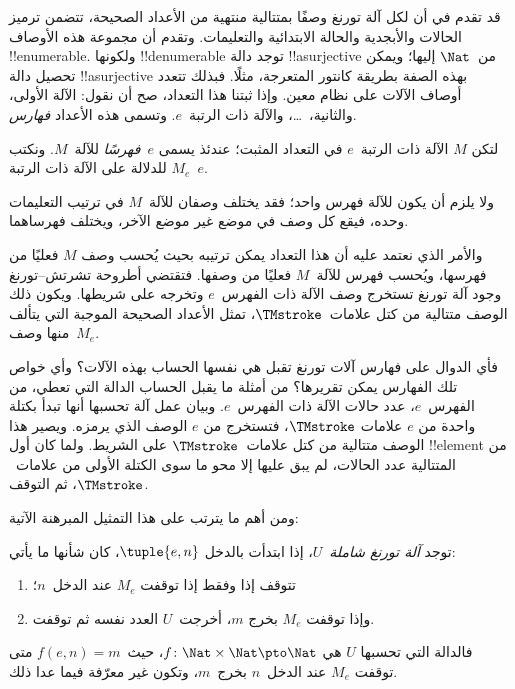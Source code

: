 \documentclass[../../../include/open-logic-section]{subfiles}
\begin{document}

قد تقدم في  أن لكل آلة تورنغ وصفًا بمتتالية
منتهية من الأعداد الصحيحة، تتضمن ترميز الحالات والأبجدية والحالة
الابتدائية والتعليمات. وتقدم أن مجموعة هذه الأوصاف !!{enumerable}.
ولكونها !!{denumerable} توجد دالة !!a{surjective} من~$\Nat$ إليها؛
ويمكن تحصيل دالة !!a{surjective} بهذه الصفة بطريقة كانتور المتعرجة،
مثلًا. فبذلك تتعدد أوصاف الآلات على نظام معين. وإذا ثبتنا هذا
التعداد، صح أن نقول: الآلة الأولى، والثانية،~\dots، والآلة ذات
الرتبة~$e$. وتسمى هذه الأعداد \emph{فهارس}.

\begin{defn}
لتكن $M$ الآلة ذات الرتبة~$e$ في التعداد المثبت؛ عندئذ يسمى
$e$~\emph{فهرسًا} للآلة~$M$. ونكتب $M_e$ للدلالة على الآلة ذات
الرتبة~$e$.
\end{defn}

ولا يلزم أن يكون للآلة فهرس واحد؛ فقد يختلف وصفان للآلة~$M$
في ترتيب التعليمات وحده، فيقع كل وصف في موضع غير موضع الآخر،
ويختلف فهرساهما.

والأمر الذي نعتمد عليه أن هذا التعداد يمكن ترتيبه بحيث يُحسب وصف
$M$ فعليًا من فهرسها، ويُحسب فهرس للآلة~$M$ فعليًا من وصفها.
فتقتضي أطروحة تشرتش--تورنغ وجود آلة تورنغ تستخرج وصف الآلة ذات
الفهرس~$e$ وتخرجه على شريطها. ويكون ذلك الوصف متتالية من كتل
علامات~$\TMstroke$، تمثل الأعداد الصحيحة الموجبة التي يتألف منها
وصف~$M_e$.

فأي الدوال على فهارس آلات تورنغ تقبل هي نفسها الحساب بهذه الآلات؟
وأي خواص تلك الفهارس يمكن تقريرها؟ من أمثلة ما يقبل الحساب الدالة
التي تعطي، من الفهرس~$e$، عدد حالات الآلة ذات الفهرس~$e$.
وبيان عمل آلة تحسبها أنها تبدأ بكتلة واحدة من $e$ علامات
$\TMstroke$، فتستخرج من $e$ الوصف الذي يرمزه. ويصير هذا الوصف
متتالية من كتل علامات~$\TMstroke$ على الشريط. ولما كان أول
!!{element} من المتتالية عدد الحالات، لم يبق عليها إلا محو ما سوى
الكتلة الأولى من علامات~$\TMstroke$، ثم التوقف.

ومن أهم ما يترتب على هذا التمثيل المبرهنة الآتية:

\begin{thm}
توجد \emph{آلة تورنغ شاملة}~$U$، إذا ابتدأت بالدخل $\tuple{e,n}$،
كان شأنها ما يأتي:
  \begin{enumerate}
    \item تتوقف إذا وفقط إذا توقفت $M_e$ عند الدخل~$n$؛
    \item وإذا توقفت $M_e$ بخرج $m$، أخرجت~$U$ العدد نفسه ثم توقفت.
  \end{enumerate}
  فالدالة التي تحسبها $U$ هي $f\colon\Nat\times\Nat\pto\Nat$،
  حيث~$f(e,n)=m$ متى توقفت $M_e$ عند الدخل~$n$ بخرج~$m$،
  وتكون غير معرّفة فيما عدا ذلك.
\end{thm}
\end{document}

